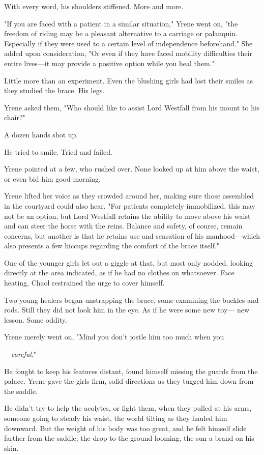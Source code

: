 With every word, his shoulders stiffened. More and more.

"If you are faced with a patient in a similar situation," Yrene went on, "the freedom of riding may be a pleasant alternative to a carriage or palanquin. Especially if they were used to a certain level of independence beforehand." She added upon consideration, "Or even if they have faced mobility difficulties their entire lives---it may provide a positive option while you heal them."

Little more than an experiment. Even the blushing girls had lost their smiles as they studied the brace. His legs.

Yrene asked them, "Who should like to assist Lord Westfall from his mount to his chair?"

A dozen hands shot up.

He tried to smile. Tried and failed.

Yrene pointed at a few, who rushed over. None looked up at him above the waist, or even bid him good morning.

Yrene lifted her voice as they crowded around her, making sure those assembled in the courtyard could also hear. "For patients completely immobilized, this may not be an option, but Lord Westfall retains the ability to move above his waist and can steer the horse with the reins. Balance and safety, of course, remain concerns, but another is that he retains use and sensation of his manhood---which also presents a few hiccups regarding the comfort of the brace itself."

One of the younger girls let out a giggle at that, but most only nodded, looking directly at the area indicated, as if he had no clothes on whatsoever. Face heating, Chaol restrained the urge to cover himself.

Two young healers began unstrapping the brace, some examining the buckles and rods. Still they did not look him in the eye. As if he were some new toy--- new lesson. Some oddity.

Yrene merely went on, "Mind you don't jostle him too much when you

---\emph{careful}."

He fought to keep his features distant, found himself missing the guards from the palace. Yrene gave the girls firm, solid directions as they tugged him down from the saddle.

He didn't try to help the acolytes, or fight them, when they pulled at his arms, someone going to steady his waist, the world tilting as they hauled him downward. But the weight of his body was too great, and he felt himself slide farther from the saddle, the drop to the ground looming, the sun a brand on his skin.

